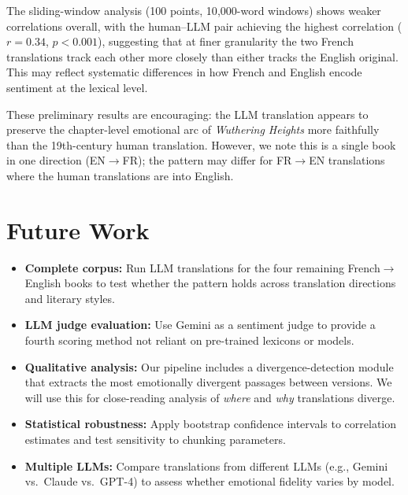 \documentclass[11pt,a4paper]{article}
\begin{document}
The sliding-window analysis (100 points, 10{,}000-word windows) shows weaker correlations overall, with the human--LLM pair achieving the highest correlation ($r{=}0.34$, $p{<}0.001$), suggesting that at finer granularity the two French translations track each other more closely than either tracks the English original.
This may reflect systematic differences in how French and English encode sentiment at the lexical level.

These preliminary results are encouraging: the LLM translation appears to preserve the chapter-level emotional arc of \textit{Wuthering Heights} more faithfully than the 19th-century human translation.
However, we note this is a single book in one direction (EN$\to$FR); the pattern may differ for FR$\to$EN translations where the human translations are into English.

\section{Future Work}

\begin{itemize}
\setlength\itemsep{0pt}
    \item \textbf{Complete corpus:} Run LLM translations for the four remaining French$\to$English books to test whether the pattern holds across translation directions and literary styles.
    \item \textbf{LLM judge evaluation:} Use Gemini as a sentiment judge to provide a fourth scoring method not reliant on pre-trained lexicons or models.
    \item \textbf{Qualitative analysis:} Our pipeline includes a divergence-detection module that extracts the most emotionally divergent passages between versions. We will use this for close-reading analysis of \textit{where} and \textit{why} translations diverge.
    \item \textbf{Statistical robustness:} Apply bootstrap confidence intervals to correlation estimates and test sensitivity to chunking parameters.
    \item \textbf{Multiple LLMs:} Compare translations from different LLMs (e.g., Gemini vs.\ Claude vs.\ GPT-4) to assess whether emotional fidelity varies by model.
\end{itemize}
\end{document}

